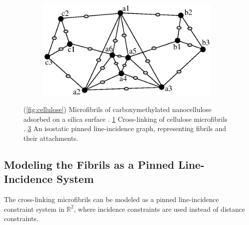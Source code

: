 \begin{figure}
\begin{subfigure}{0.32\linewidth}
    \caption{}\label{fig:crosslink}
\end{subfigure}\hfill%
\begin{subfigure}{0.32\linewidth}\centering
    \includegraphics[height=\myMinHeight]{../../img/pinned}
    \caption{}
    \label{fig:pinned_line}
\end{subfigure}%
\caption{(\ref{fig:cellulose}) Microfibrils of carboxymethylated nanocellulose adsorbed on a silica surface \cite{wikimediacommons2010afm}. \ref{fig:crosslink} Cross-linking of cellulose microfibrils \cite{wikimediacommons2007plant}. \ref{fig:pinned_line} An isostatic pinned line-incidence graph, representing fibrils and their attachments.}
\end{figure}%



\subsection{Modeling the Fibrils as a Pinned Line-Incidence System}



The cross-linking microfibrils can be modeled as a pinned line-incidence constraint system in $\mathbb{R}^2$, where incidence constraints are used instead of distance constraints.

